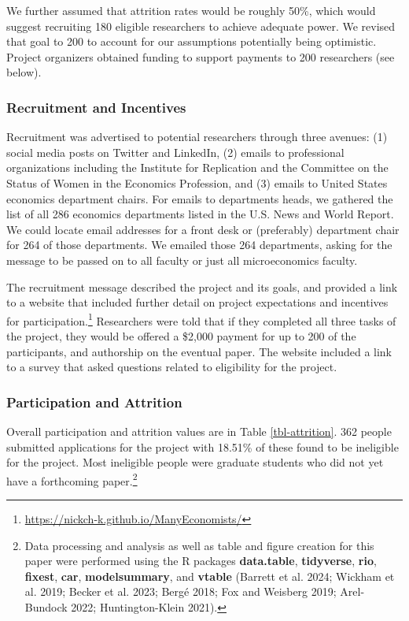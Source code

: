 \documentclass[
  letterpaper,
  DIV=11,
  numbers=noendperiod]{scrartcl}
\begin{document}
We further assumed that attrition rates would be roughly 50\%, which
would suggest recruiting 180 eligible researchers to achieve adequate
power. We revised that goal to 200 to account for our assumptions
potentially being optimistic. Project organizers obtained funding to
support payments to 200 researchers (see below).

\subsubsection{Recruitment and
Incentives}\label{recruitment-and-incentives}

Recruitment was advertised to potential researchers through three
avenues: (1) social media posts on Twitter and LinkedIn, (2) emails to
professional organizations including the Institute for Replication and
the Committee on the Status of Women in the Economics Profession, and
(3) emails to United States economics department chairs. For emails to
departments heads, we gathered the list of all 286 economics departments
listed in the U.S. News and World Report. We could locate email
addresses for a front desk or (preferably) department chair for 264 of
those departments. We emailed those 264 departments, asking for the
message to be passed on to all faculty or just all microeconomics
faculty.

The recruitment message described the project and its goals, and
provided a link to a website that included further detail on project
expectations and incentives for participation.\footnote{\url{https://nickch-k.github.io/ManyEconomists/}}
Researchers were told that if they completed all three tasks of the
project, they would be offered a \$2,000 payment for up to 200 of the
participants, and authorship on the eventual paper. The website included
a link to a survey that asked questions related to eligibility for the
project.

\subsubsection{Participation and
Attrition}\label{participation-and-attrition}

Overall participation and attrition values are in Table
\ref{tbl-attrition}. 362 people submitted applications for the project
with 18.51\% of these found to be ineligible for the project. Most
ineligible people were graduate students who did not yet have a
forthcoming paper.\footnote{Data processing and analysis as well as
  table and figure creation for this paper were performed using the R
  packages \textbf{data.table}, \textbf{tidyverse}, \textbf{rio},
  \textbf{fixest}, \textbf{car}, \textbf{modelsummary}, and
  \textbf{vtable} (Barrett et al. 2024; Wickham et al. 2019; Becker et
  al. 2023; Bergé 2018; Fox and Weisberg 2019; Arel-Bundock 2022;
  Huntington-Klein 2021).}
\end{document}
